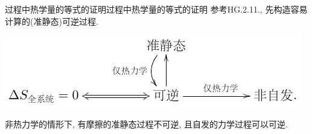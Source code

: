 \documentclass{ctexart}
\begin{document}
\begin{reflex}
	{过程中热学量的等式的证明}{过程中热学量的等式的证明} 参考HG.2.11., 先构造容易计算的(准静态)可逆过程.
\end{reflex}

\begin{finale}
	\centerline{
		\includegraphics{src/relations.pdf}
	}
	非热力学的情形下, 有摩擦的准静态过程不可逆, 且自发的力学过程可以可逆.
\end{finale}

\end{document}
